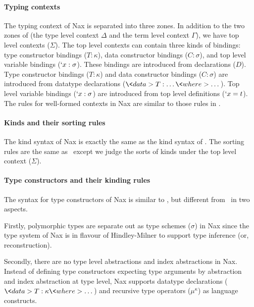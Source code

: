 \paragraph{Typing contexts}
The typing context of Nax is separated into three zones. In addition to
the two zones of \Fi (the type level context $\Delta$ and
the term level context $\Gamma$), we have top level contexts ($\Sigma$).
The top level contexts can contain three kinds of bindings:
type constructor bindings ($T:\kappa$), data constructor bindings ($C:\sigma$),
and top level variable bindings ($`x:\sigma$). These bindings are introduced
from declarations ($D$). Type constructor bindings ($T:\kappa$) and
data constructor bindings ($C:\sigma$) are introduced from datatype declarations
($\<data> T:\dots \<where> \dots$). Top level variable bindings ($`x:\sigma$)
are introduced from top level definitions ($`x = t$).
The rules for well-formed contexts in Nax are similar to those rules in \Fi.

\paragraph{Kinds and their sorting rules}
The kind syntax of Nax is exactly the same as the kind syntax of \Fi.
The sorting rules are the same as \Fi\ except we judge the sorts of kinds
under the top level context ($\Sigma$).

\paragraph{Type constructors and their kinding rules}
The syntax for type constructors of Nax is similar to \Fi, but
different from \Fi\ in two aspects.

Firstly, polymorphic types are separate out as type schemes ($\sigma$) in Nax
since the type system of Nax is in flavour of Hindley-Milner to support
type inference (or, reconstruction).

Secondly, there are no type level abstractions and index abstractions in Nax.
Instead of defining type constructors expecting type arguments by abstraction
and index abstraction at type level, Nax supports datatype declarations
($\<data> T:\kappa \<where> \dots$) and recursive type operators
($\mu^\kappa$) as language constructs.

